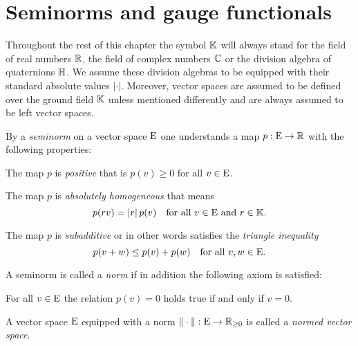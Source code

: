 %
\section{Seminorms and gauge functionals}
\label{sec:seminorms-gauge-functionals}
%
%
\para Throughout the rest of this chapter the symbol $\mathbb{K}$ will always
stand for the field of real numbers $\mathbb{R}$, the field of complex numbers $\mathbb{C}$ or the
division algebra of quaternions $\mathbb{H}$. We assume these division algebras to be equipped
with their standard absolute values $|\cdot |$.
Moreover, vector spaces are assumed to be defined over the ground field $\mathbb{K}$
unless mentioned differently and are always assumed to be left vector spaces. 

\begin{definition}
  By a \emph{seminorm} on a vector space $\mathrm{E}$ one 
  understands a map $p:\mathrm{E} \to \mathbb{R}$ with the following properties:
  \begin{axiomlist}[N]
  \setcounter{enumi}{-1}  
  \item\label{axiom:positive}
    The  map $p$ is \emph{positive} that is $p(v)\geq 0$ for all $v\in \mathrm{E}$.
  \item
  \label{axiom:norm-absolute-homogeneity} 
     The map $p$ is \emph{absolutely homogeneous} that means
     \[
       p(r v) = |r| \, p(v)  \quad \text{for all $v \in \mathrm{E}$ and $r\in \mathbb{K}$}.
     \]
  \item
  \label{axiom:norm-subadditivity} 
     The map $p$ is \emph{subadditive} or in other words satisfies the \emph{triangle inequality} 
     \[ 
       p(v+w) \leq p(v) + p(w) \quad \text{for all $v,w \in \mathrm{E}$}.
     \] 
  \end{axiomlist}
  A seminorm is called a \emph{norm} if in addition the following axiom is satisfied:
  \begin{axiomlist}[N]
  \setcounter{enumi}{2}
  \item \label{axiom:norm-nondegeneracy} 
     For all $v\in \mathrm{E}$ the relation $p(v) = 0$ holds true if and only if $v = 0$.
  \end{axiomlist}
  A vector space $\mathrm{E}$ equipped with a norm 
  $\| \cdot \| : \mathrm{E} \to \mathbb{R}_{\geq 0}$ is called a \emph{normed vector space}.
\end{definition}

